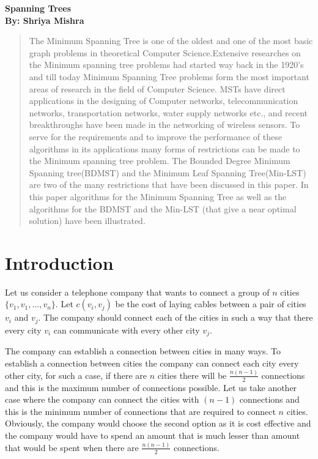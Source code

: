\documentclass[12pt]{article}
\theoremstyle{plain}
\begin{document}
\begin{center}
{\huge \textbf {Spanning Trees}}\\
{\bf By: Shriya Mishra}
\end{center}
\begin{abstract}

The Minimum Spanning Tree is one of the oldest and one of the most basic graph problems in theoretical Computer Science.Extensive researches on the Minimum spanning tree problems had started way back in the 1920's and till today Minimum Spanning Tree problems form the most important areas of research in the field of Computer Science. MSTs have direct applications in the designing of Computer networks, telecommunication networks, transportation networks, water supply networks etc., and recent breakthroughs have been made in the networking of wireless sensors. To serve for the requirements and to improve the performance of these algorithms in its applications many forms of restrictions can be made to the Minimum spanning tree problem. The Bounded Degree Minimum Spanning tree(BDMST) and the Minimum Leaf Spanning Tree(Min-LST) are two of the many restrictions that have been discussed in this paper. In this paper algorithms for the Minimum Spanning Tree as well as the algorithms for the BDMST and the Min-LST (that give a near optimal solution) have been illustrated. 

\end{abstract}

\section*{Introduction}

 Let us consider a telephone company that wants to connect a group of $n$ cities $\{v_1, v_1, 
\ldots,v_n\}$. 
 Let $c(v_i, v_j)$ be the cost of laying cables between a pair of cities $v_i$ and $v_j$. The 
company should connect each of the cities in such a way that there every city $v_i$ can 
communicate with every other city $v_j$.

 The company can establish a connection between cities in many ways. To establish a connection 
between cities the company can connect each city every other city, for such a case, if there 
are $n$ cities there will be $ \frac{n(n-1)}{2} $ connections and this is the maximum number of 
connections possible. Let us take another case where the company can connect the cities with 
$(n-1)$ connections and this is the minimum number of connections that are required to connect 
$n$ cities. Obviously, the company would choose the second option as it is cost effective and
the company would have to spend an amount that is much lesser than amount that would be spent 
when there are $ \frac{n(n-1)}{2} $ connections. 
\end{document}
